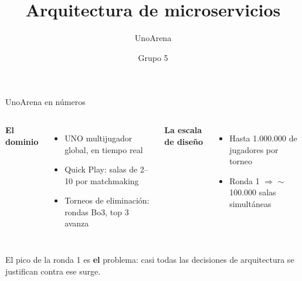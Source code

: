 \documentclass[aspectratio=169,10pt]{beamer}
\title{Arquitectura de microservicios}
\subtitle{UnoArena}
\author{Grupo 5}
\date{}
\begin{document}
\maketitle

\begin{frame}{UnoArena en números}
  \begin{columns}[T]
      \textbf{El dominio}
      \begin{itemize}
        \item UNO multijugador global, en tiempo real
        \item \alert{Quick Play}: salas de 2--10 por matchmaking
        \item \alert{Torneos de eliminación}: rondas Bo3, top 3 avanza
      \end{itemize}
      \textbf{La escala de diseño}
      \begin{itemize}
        \item Hasta \alert{1.000.000} de jugadores por torneo
        \item Ronda 1 $\Rightarrow$ \alert{$\sim$100.000 salas simultáneas}
      \end{itemize}
  \end{columns}
  \vfill
  \begin{center}
    \colorbox{cKafka!15}{\parbox{0.86\textwidth}{\centering\small
      El pico de la ronda 1 es \textbf{el} problema: casi todas las decisiones
      de arquitectura se justifican contra ese surge.}}
  \end{center}
\end{frame}
\end{document}
